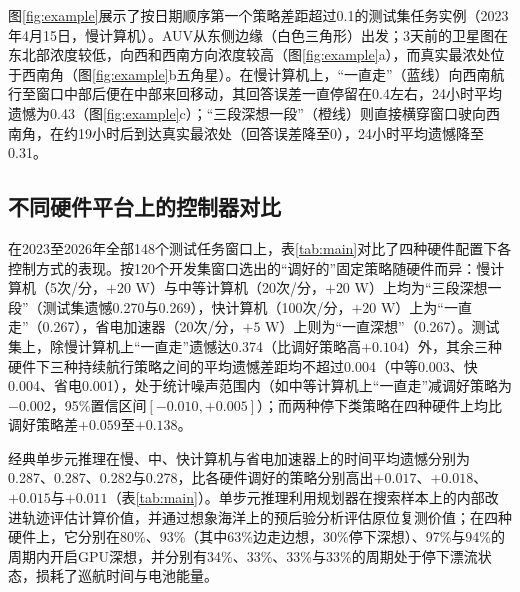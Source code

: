 图\ref{fig:example}展示了按日期顺序第一个策略差距超过0.1的测试集任务实例（2023年4月15日，慢计算机）。AUV从东侧边缘（白色三角形）出发；3天前的卫星图在东北部浓度较低，向西和西南方向浓度较高（图\ref{fig:example}a），而真实最浓处位于西南角（图\ref{fig:example}b五角星）。在慢计算机上，“一直走”（蓝线）向西南航行至窗口中部后便在中部来回移动，其回答误差一直停留在0.4左右，24小时平均遗憾为0.43（图\ref{fig:example}c）；“三段深想一段”（橙线）则直接横穿窗口驶向西南角，在约19小时后到达真实最浓处（回答误差降至0），24小时平均遗憾降至0.31。

\subsection{不同硬件平台上的控制器对比}

在2023至2026年全部148个测试任务窗口上，表\ref{tab:main}对比了四种硬件配置下各控制方式的表现。按120个开发集窗口选出的“调好的”固定策略随硬件而异：慢计算机（5次/分，$+20\text{ W}$）与中等计算机（20次/分，$+20\text{ W}$）上均为“三段深想一段”（测试集遗憾0.270与0.269），快计算机（100次/分，$+20\text{ W}$）上为“一直走”（0.267），省电加速器（20次/分，$+5\text{ W}$）上则为“一直深想”（0.267）。测试集上，除慢计算机上“一直走”遗憾达0.374（比调好策略高$+0.104$）外，其余三种硬件下三种持续航行策略之间的平均遗憾差距均不超过0.004（中等0.003、快0.004、省电0.001），处于统计噪声范围内（如中等计算机上“一直走”减调好策略为$-0.002$，95\%置信区间$[-0.010, +0.005]$）；而两种停下类策略在四种硬件上均比调好策略差$+0.059$至$+0.138$。

\begin{table}[htbp]
  \centering
  \caption{2023至2026年148个测试集任务（3天前卫星图，真实海洋偏离0.15，传感器误差0.1）上各控制方式的时间平均遗憾（越低越好）。“调好的”指在该型航行器的120个开发集任务上表现最好的固定策略；括号内为相对于“调好的”策略的差值，方括号内为按赤潮周自助重采样得到的95\%置信区间。}
  \label{tab:main}
  
\end{table}

经典单步元推理在慢、中、快计算机与省电加速器上的时间平均遗憾分别为0.287、0.287、0.282与0.278，比各硬件调好的策略分别高出$+0.017$、$+0.018$、$+0.015$与$+0.011$（表\ref{tab:main}）。单步元推理利用规划器在搜索样本上的内部改进轨迹评估计算价值，并通过想象海洋上的预后验分析评估原位复测价值；在四种硬件上，它分别在80\%、93\%（其中63\%边走边想，30\%停下深想）、97\%与94\%的周期内开启GPU深想，并分别有34\%、33\%、33\%与33\%的周期处于停下漂流状态，损耗了巡航时间与电池能量。


